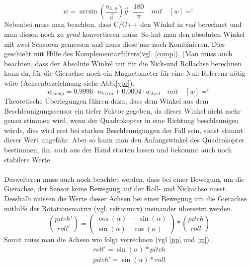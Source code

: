 \documentclass[12pt,a4paper, ngerman]{article}
\begin{document}
\begin{equation}\label{gangle}
w=\arcsin(\frac{a_{x,y}}{\vec{a}}
)
\vec{g}\cdot \frac{180}{\pi} \quad mit \quad [w]=^\circ
\end{equation}
Nebenbei muss man beachten, dass C/C++ den Winkel in $rad$ berechnet und man diesen noch zu $grad$ konvertieren muss. So hat man den absoluten Winkel mit zwei Sensoren gemessen und muss diese nur noch Kombinieren. Dies geschieht mit Hilfe des Komplementärflilters(vgl. \ref{comp}). (Man muss auch beachten, dass der Absolute Winkel nur für die Nick-und Rollachse berechnen kann da, für die Gierachse noch ein Magnetometer für eine Null-Referenz nötig wäre (Achsenbezeichnung siehe Abb.\ref{ypr}).
\begin{equation}\label{comp}
w_{\text{komp}}=0.9996\cdot w_{\text{Gyro}}+0.0004\cdot w_{\text{Accl}} \quad mit \quad [w]=^\circ
\end{equation}
Theoretische Überlegungen führen dazu, dass dem Winkel aus dem Beschleunigungssensor ein tiefer Faktor gegeben, da dieser Winkel nicht mehr genau stimmen wird, wenn der Quadrokopter in eine Richtung beschleunigen würde, dies wird erst bei starken Beschleunigungen der Fall sein, sonst stimmt dieser Wert ungefähr. Aber so kann man den Anfangswinkel des Quadrokopter bestimmen, ihn auch aus der Hand starten lassen und bekommt auch noch stabilere Werte.\\ \\
Desweiteren muss auch noch beachtet werden, dass bei einer Bewegung um die Gierachse, der Sensor keine Bewegung auf der Roll- und Nickachse misst. Desshalb müssen die Werte dieser Achsen bei einer Bewegung um die Gierachse mithilfe der Rotationsmatrix (vgl. ref{rotmax}) ineinander übersetzt werden.
\begin{equation}\label{rotmax}
\binom{pitch'}{roll'}=\begin{pmatrix}
\cos(\alpha) & -\sin(\alpha)\\ 
\sin(\alpha) & \cos(\alpha)
\end{pmatrix}*\binom{pitch}{roll}
\end{equation}
Somit muss man die Achsen wie folgt verrechnen (vgl \ref{pp} und \ref{rr}).
\begin{align}
roll' = \sin(\alpha)*pitch \label{pp}\\
pitch'= \sin(\alpha)*roll \label{rr}
\end{align} 
\end{document}
